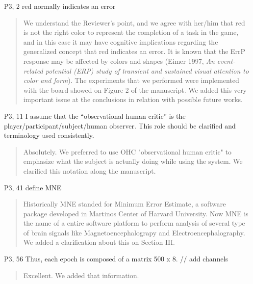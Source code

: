\documentclass[journal,onecolumn,12pt]{IEEEtran}
\begin{document}
P3, 2 red normally indicates an error

\vspace{2em}
\begin{quotation}
{\color{blue}
We understand the Reviewer's point, and we agree with her/him that red is not the right color to represent the completion of a task in the game, and in this case it may have cognitive implications regarding the generalized concept that red indicates an error.   It is known that the ErrP response may be affected by colors and shapes (Eimer 1997, \textit{An event-related potential (ERP) study of transient and sustained visual attention to color and form}).  The experiments that we performed were implemented with the board showed on Figure 2 of the manuscript.  We added this very important issue at the conclusions in relation with possible future works.
}
\end{quotation}
\vspace{2em}

P3, 11 I assume that the “observational human critic” is the player/participant/subject/human observer. This role should be clarified and terminology used consistently.

\vspace{2em}
\begin{quotation}
{\color{blue}
Absolutely.  We preferred to use OHC "observational human critic" to emphasize what the subject is actually doing while using the system.  We clarified this notation along the manuscript.
}
\end{quotation}
\vspace{2em}

P3, 41 define MNE

\vspace{2em}
\begin{quotation}
{\color{blue}
Historically MNE standed for Minimum Error Estimate, a software package developed in Martinos Center of Harvard University.  Now MNE  is the name of a entire software platform to perform analysis of several type of brain signals like Magnetoencephalograpy and Electroencephalography.  We added a clarification about this on Section III.
}
\end{quotation}
\vspace{2em}

P3, 56 Thus, each epoch is composed of a matrix 500 x 8. // add channels

\vspace{2em}
\begin{quotation}
{\color{blue}
Excellent.  We added that information.
}
\end{quotation}
\vspace{2em}
\end{document}
